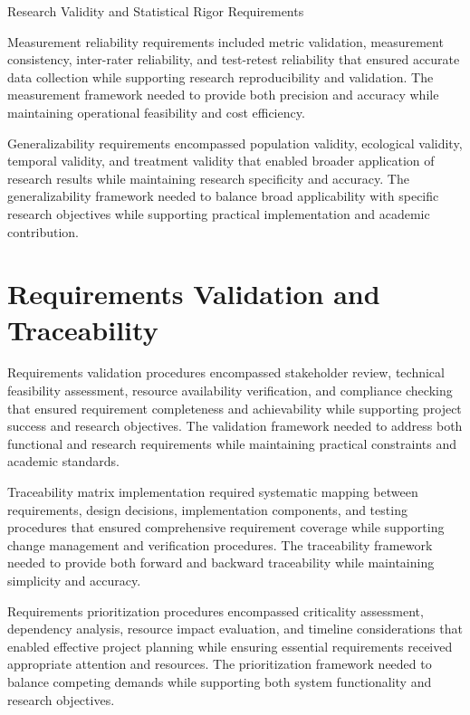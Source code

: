 \begin{table}[H]
\centering
\caption{Research Validity and Statistical Rigor Requirements}
\label{tab:research-validity-framework}
\end{table}

Measurement reliability requirements included metric validation, measurement consistency, inter-rater reliability, and test-retest reliability that ensured accurate data collection while supporting research reproducibility and validation. The measurement framework needed to provide both precision and accuracy while maintaining operational feasibility and cost efficiency.

Generalizability requirements encompassed population validity, ecological validity, temporal validity, and treatment validity that enabled broader application of research results while maintaining research specificity and accuracy. The generalizability framework needed to balance broad applicability with specific research objectives while supporting practical implementation and academic contribution.

\section{Requirements Validation and Traceability}

Requirements validation procedures encompassed stakeholder review, technical feasibility assessment, resource availability verification, and compliance checking that ensured requirement completeness and achievability while supporting project success and research objectives. The validation framework needed to address both functional and research requirements while maintaining practical constraints and academic standards.

Traceability matrix implementation required systematic mapping between requirements, design decisions, implementation components, and testing procedures that ensured comprehensive requirement coverage while supporting change management and verification procedures. The traceability framework needed to provide both forward and backward traceability while maintaining simplicity and accuracy.

Requirements prioritization procedures encompassed criticality assessment, dependency analysis, resource impact evaluation, and timeline considerations that enabled effective project planning while ensuring essential requirements received appropriate attention and resources. The prioritization framework needed to balance competing demands while supporting both system functionality and research objectives.

